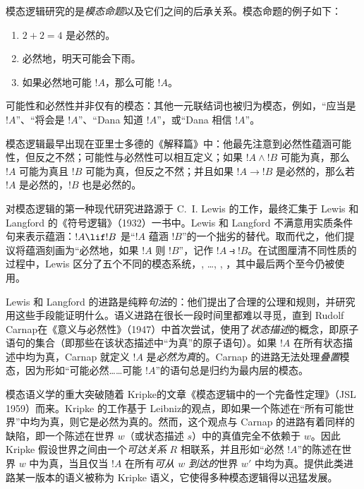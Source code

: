 \documentclass[../../../include/open-logic-section]{subfiles}
\begin{document}


模态逻辑研究的是\emph{模态命题}以及它们之间的后承关系。模态命题的例子如下：

\begin{enumerate}
\item  $2+2=4$ 是必然的。
\item  必然地，明天可能会下雨。
\item  如果必然地可能 $!A$，那么可能 $!A$。
\end{enumerate}

可能性和必然性并非仅有的模态：其他一元联结词也被归为模态，例如，“应当是 $!A$”、“将会是 $!A$”、“Dana 知道 $!A$”，或“Dana 相信 $!A$”。

模态逻辑最早出现在亚里士多德的《解释篇》中：他最先注意到必然性蕴涵可能性，但反之不然；可能性与必然性可以相互定义；如果 $!A \land !B$ 可能为真，那么 $!A$ 可能为真且 $!B$ 可能为真，但反之不然；并且如果 $!A \to !B$ 是必然的，那么若 $!A$ 是必然的，$!B$ 也是必然的。

对模态逻辑的第一种现代研究进路源于 C.~I. Lewis 的工作，最终汇集于 Lewis 和 Langford 的《符号逻辑》（1932）一书中。Lewis 和 Langford 不满意用实质条件句来表示蕴涵：$!A \lif !B$ 是“$!A$ 蕴涵 $!B$”的一个拙劣的替代。取而代之，他们提议将蕴涵刻画为“必然地，如果 $!A$ 则 $!B$”，记作 $!A \strictif !B$。在试图厘清不同性质的过程中，Lewis 区分了五个不同的模态系统，, \ldots, , ，其中最后两个至今仍被使用。

Lewis 和 Langford 的进路是纯粹\emph{句法}的：他们提出了合理的公理和规则，并研究用这些手段能证明什么。语义进路在很长一段时间里都难以寻觅，直到 Rudolf Carnap在《意义与必然性》（1947）中首次尝试，使用了\emph{状态描述}的概念，即原子语句的集合（即那些在该状态描述中“为真”的原子语句）。如果 $!A$ 在所有状态描述中均为真，Carnap 就定义 $!A$ 是\emph{必然为真}的。Carnap 的进路无法处理\emph{叠置}模态，因为形如“可能必然……可能 $!A$”的语句总是归约为最内层的模态。

模态语义学的重大突破随着 Kripke的文章《模态逻辑中的一个完备性定理》（JSL 1959）而来。Kripke 的工作基于 Leibniz的观点，即如果一个陈述在“所有可能世界”中均为真，则它是必然为真的。然而，这个观点与 Carnap 的进路有着同样的缺陷，即一个陈述在世界 $w$（或状态描述 $s$）中的真值完全不依赖于 $w$。因此 Kripke 假设世界之间由一个\emph{可达关系} $R$ 相联系，并且形如“必然 $!A$”的陈述在世界 $w$ 中为真，当且仅当 $!A$ 在所有\emph{可从 $w$ 到达的}世界 $w'$ 中均为真。提供此类进路某一版本的语义被称为 Kripke 语义，它使得多种模态逻辑得以迅猛发展。
\end{document}
